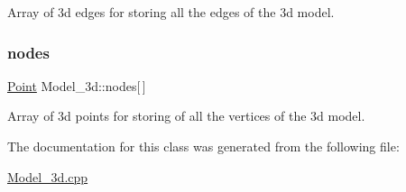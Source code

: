 Array of 3d edges for storing all the edges of the 3d model. \mbox{\label{class_model__3d_a9872f3156fbcdd16fff4124fdcf60a06}} 
\subsubsection{\texorpdfstring{nodes}{nodes}}
{\footnotesize\ttfamily \hyperlink{class_point}{Point} Model\+\_\+3d\+::nodes\mbox{[}$\,$\mbox{]}}

Array of 3d points for storing of all the vertices of the 3d model. 

The documentation for this class was generated from the following file\+:\begin{DoxyCompactItemize}
\item 
\hyperlink{_model__3d_8cpp}{Model\+\_\+3d.\+cpp}\end{DoxyCompactItemize}
